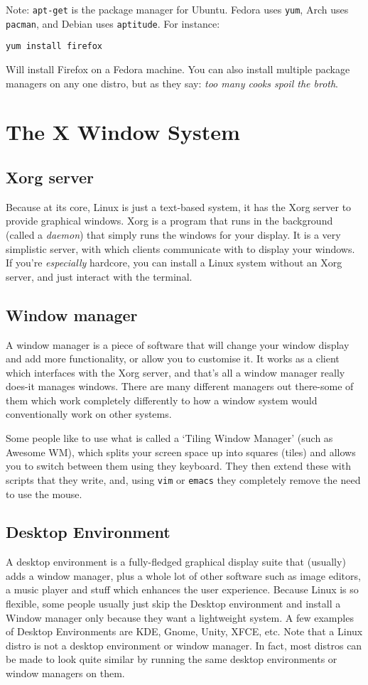 \documentclass{article}
\begin{document}
Note: \texttt{apt-get} is the package manager for Ubuntu. Fedora uses \texttt{yum}, Arch uses \texttt{pacman}, and Debian uses \texttt{aptitude}. For instance:
\begin{verbatim}
yum install firefox
\end{verbatim}
Will install Firefox on a Fedora machine.
You can also install multiple package managers on any one distro, but as they say: \emph{too many cooks spoil the broth}.

\section{The X Window System}

\subsection{Xorg server}
Because at its core, Linux is just a text-based system, it has the Xorg server to provide graphical windows. Xorg is a program that runs in the background (called a \emph{daemon}) that simply runs the windows for your display. It is a very simplistic server, with which clients communicate with to display your windows. If you're \emph{especially} hardcore, you can install a Linux system without an Xorg server, and just interact with the terminal. 

\subsection{Window manager}
A window manager is a piece of software that will change your window display and add more functionality, or allow you to customise it. It works as a client which interfaces with the Xorg server, and that's all a window manager really does-it manages windows. There are many different managers out there-some of them which work completely differently to how a window system would conventionally work on other systems. 

Some people like to use what is called a `Tiling Window Manager' (such as Awesome WM), which splits your screen space up into squares (tiles) and allows you to switch between them using they keyboard. They then extend these with scripts that they write, and, using \texttt{vim} or \texttt{emacs} they completely remove the need to use the mouse.

\subsection{Desktop Environment}
A desktop environment is a fully-fledged graphical display suite that (usually) adds a window manager, plus a whole lot of other software such as image editors, a music player and stuff which enhances the user experience. Because Linux is so flexible, some people usually just skip the Desktop environment and install a Window manager only because they want a lightweight system. A few examples of Desktop Environments are KDE, Gnome, Unity, XFCE, etc. Note that a Linux distro is not a desktop environment or window manager. In fact, most distros can be made to look quite similar by running the same desktop environments or window managers on them.
\end{document}
